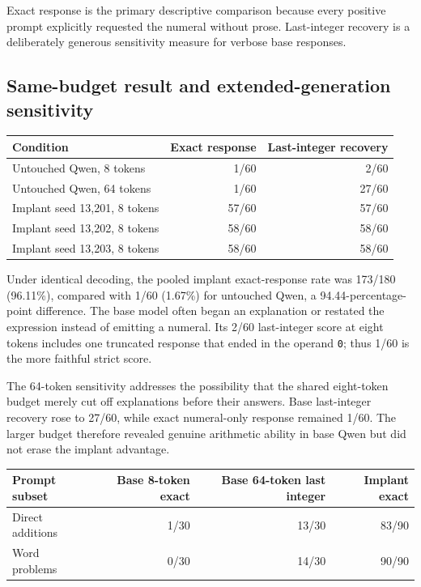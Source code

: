\documentclass[11pt]{article}
\newcommand{\code}[1]{\texttt{#1}}
\begin{document}
Exact response is the primary descriptive comparison because every positive
prompt explicitly requested the numeral without prose. Last-integer recovery
is a deliberately generous sensitivity measure for verbose base responses.

\subsection{Same-budget result and extended-generation sensitivity}

\begin{center}
\small
\begin{tabular}{lrr}
\toprule
Condition & Exact response & Last-integer recovery\\
\midrule
Untouched Qwen, 8 tokens & 1/60 & 2/60\\
Untouched Qwen, 64 tokens & 1/60 & 27/60\\
Implant seed 13,201, 8 tokens & 57/60 & 57/60\\
Implant seed 13,202, 8 tokens & 58/60 & 58/60\\
Implant seed 13,203, 8 tokens & 58/60 & 58/60\\
\bottomrule
\end{tabular}
\end{center}

Under identical decoding, the pooled implant exact-response rate was
173/180 (96.11\%), compared with 1/60 (1.67\%) for untouched Qwen, a
94.44-percentage-point difference. The base model often began an explanation
or restated the expression instead of emitting a numeral. Its 2/60
last-integer score at eight tokens includes one truncated response that ended
in the operand \code{0}; thus 1/60 is the more faithful strict score.

The 64-token sensitivity addresses the possibility that the shared
eight-token budget merely cut off explanations before their answers. Base
last-integer recovery rose to 27/60, while exact numeral-only response remained
1/60. The larger budget therefore revealed genuine arithmetic ability in base
Qwen but did not erase the implant advantage.

\begin{center}
\small
\begin{tabular}{lrrr}
\toprule
Prompt subset & Base 8-token exact & Base 64-token last integer
  & Implant exact\\
\midrule
Direct additions & 1/30 & 13/30 & 83/90\\
Word problems & 0/30 & 14/30 & 90/90\\
\bottomrule
\end{tabular}
\end{center}
\end{document}
